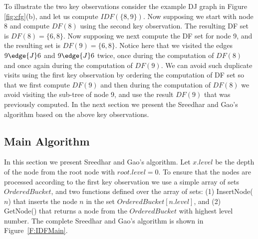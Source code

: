 To illustrate the two key observations consider the example DJ graph in Figure \ref{fig:cfg}(b),
and let us compute $IDF(\{8,9\})$. Now supposing we start with node 8 and compute 
$DF(8)$ using the second key observation. The resulting DF set is $DF(8) = \{6,8\}$. 
Now supposing we next compute the DF set for node 9, and the resulting set is
$DF(9) = \{6,8\}$. Notice here that we visited the edges $9 \edge{J} 6$ and
$9 \edge{J} 6$ twice, once during the computation of $DF(8)$ and once again
during the computation of $DF(9)$. We can avoid such duplicate visits using the
first key observation by ordering the computation of DF set so that we first compute
$DF(9)$ and then during the computation of $DF(8)$ we avoid visiting the sub-tree of
node 9, and use the result $DF(9)$ that was previously computed. In the next section
we present the Sreedhar and Gao's algorithm based on the above key observations.


\subsection{Main Algorithm}

In this section we present Sreedhar and Gao's algorithm. Let $x.level$ be the
depth of the node from the root node with $root.level= 0$. To ensure that the nodes
are processed according to the first key observation we use  a simple 
 array of sets $OrderedBucket$, and two functions defined over the array of sets:
(1) InsertNode($n$) that inserts the node $n$ in the set $OrderedBucket[n.level]$, and
(2) GetNode() that returns a node from the $OrderedBucket$ with highest level number. 
The complete Sreedhar and Gao's algorithm is shown in Figure~\ref{F:IDFMain}.

